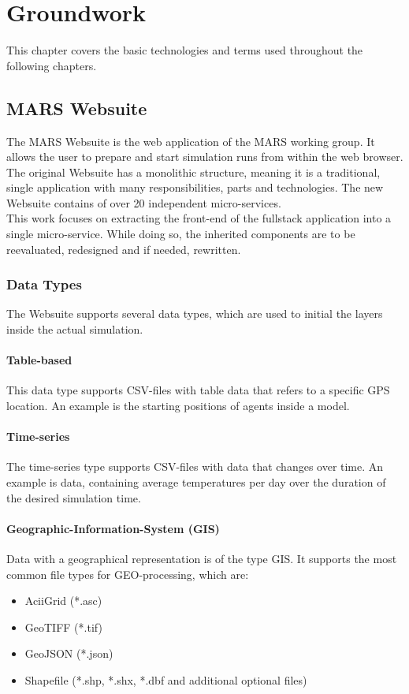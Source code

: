 
\chapter{Groundwork}
This chapter covers the basic technologies and terms used throughout the following chapters.



\section{MARS Websuite}
The MARS Websuite is the web application of the MARS working group. It allows the user to prepare and start simulation runs from within the web browser.\\
The original Websuite has a monolithic structure, meaning it is a traditional, single application with many responsibilities, parts and technologies. The new Websuite contains of over 20 independent micro-services.\\
This work focuses on extracting the front-end of the fullstack application into a single micro-service. While doing so, the inherited components are to be reevaluated, redesigned and if needed, rewritten.


\subsection{Data Types}
\label{sec:data-types}
The Websuite supports several data types, which are used to initial the layers inside the actual simulation.

\subsubsection{Table-based}
This data type supports CSV-files with table data that refers to a specific GPS location. An example is the starting positions of agents inside a model.

\subsubsection{Time-series}
The time-series type supports CSV-files with data that changes over time. An example is data, containing average temperatures per day over the duration of the desired simulation time.

\subsubsection{Geographic-Information-System (GIS)}
Data with a geographical representation is of the type GIS. It supports the most common file types for GEO-processing, which are:
\begin{itemize}
	\item AciiGrid (*.asc)
	\item GeoTIFF (*.tif)
	\item GeoJSON (*.json)
	\item Shapefile (*.shp, *.shx, *.dbf and additional optional files)
\end{itemize}

